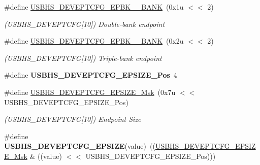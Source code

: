 \begin{DoxyCompactItemize}
\mbox{\label{group__SAMV71__USBHS_ga007501247a16b5f40536efe67c660458}} 
\#define \mbox{\hyperlink{group__SAMV71__USBHS_ga007501247a16b5f40536efe67c660458}{U\+S\+B\+H\+S\+\_\+\+D\+E\+V\+E\+P\+T\+C\+F\+G\+\_\+\+E\+P\+B\+K\+\_\+\_\+\+B\+A\+NK}}~(0x1u $<$$<$ 2)
\begin{DoxyCompactList}\small\item\em (U\+S\+B\+H\+S\+\_\+\+D\+E\+V\+E\+P\+T\+C\+FG\mbox{[}10\mbox{]}) Double-\/bank endpoint \end{DoxyCompactList}\item 
\mbox{\label{group__SAMV71__USBHS_gaacf793331bc0eb223c5ed1a5e8712165}} 
\#define \mbox{\hyperlink{group__SAMV71__USBHS_gaacf793331bc0eb223c5ed1a5e8712165}{U\+S\+B\+H\+S\+\_\+\+D\+E\+V\+E\+P\+T\+C\+F\+G\+\_\+\+E\+P\+B\+K\+\_\+\_\+\+B\+A\+NK}}~(0x2u $<$$<$ 2)
\begin{DoxyCompactList}\small\item\em (U\+S\+B\+H\+S\+\_\+\+D\+E\+V\+E\+P\+T\+C\+FG\mbox{[}10\mbox{]}) Triple-\/bank endpoint \end{DoxyCompactList}\item 
\mbox{\label{group__SAMV71__USBHS_ga9680371b4a34336747267e14d1f6bf4c}} 
\#define {\bfseries U\+S\+B\+H\+S\+\_\+\+D\+E\+V\+E\+P\+T\+C\+F\+G\+\_\+\+E\+P\+S\+I\+Z\+E\+\_\+\+Pos}~4
\item 
\mbox{\label{group__SAMV71__USBHS_ga5e7d8a83079e1c65a44d5028003969e0}} 
\#define \mbox{\hyperlink{group__SAMV71__USBHS_ga5e7d8a83079e1c65a44d5028003969e0}{U\+S\+B\+H\+S\+\_\+\+D\+E\+V\+E\+P\+T\+C\+F\+G\+\_\+\+E\+P\+S\+I\+Z\+E\+\_\+\+Msk}}~(0x7u $<$$<$ U\+S\+B\+H\+S\+\_\+\+D\+E\+V\+E\+P\+T\+C\+F\+G\+\_\+\+E\+P\+S\+I\+Z\+E\+\_\+\+Pos)
\begin{DoxyCompactList}\small\item\em (U\+S\+B\+H\+S\+\_\+\+D\+E\+V\+E\+P\+T\+C\+FG\mbox{[}10\mbox{]}) Endpoint Size \end{DoxyCompactList}\item 
\mbox{\label{group__SAMV71__USBHS_ga00d0483c92acda760b06343a5291bc53}} 
\#define {\bfseries U\+S\+B\+H\+S\+\_\+\+D\+E\+V\+E\+P\+T\+C\+F\+G\+\_\+\+E\+P\+S\+I\+ZE}(value)~((\mbox{\hyperlink{group__SAMV71__USBHS_ga5e7d8a83079e1c65a44d5028003969e0}{U\+S\+B\+H\+S\+\_\+\+D\+E\+V\+E\+P\+T\+C\+F\+G\+\_\+\+E\+P\+S\+I\+Z\+E\+\_\+\+Msk}} \& ((value) $<$$<$ U\+S\+B\+H\+S\+\_\+\+D\+E\+V\+E\+P\+T\+C\+F\+G\+\_\+\+E\+P\+S\+I\+Z\+E\+\_\+\+Pos)))

\end{DoxyCompactItemize}
